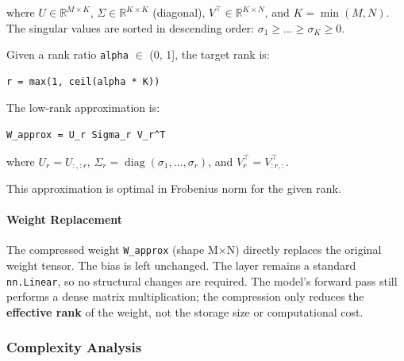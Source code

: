 where $U \in \mathbb{R}^{M \times K}$, $\Sigma \in \mathbb{R}^{K \times K}$ (diagonal), $V^\top \in \mathbb{R}^{K \times N}$, and $K = \min(M,N)$. The singular values are sorted in descending order: $\sigma_1 \ge \dots \ge \sigma_K \ge 0$.

Given a rank ratio \texttt{alpha} $\in$ (0, 1], the target rank is:

\vspace{0.5em}
\begin{mdframed}[backgroundcolor=codebg, linecolor=codeframe, linewidth=1pt, roundcorner=4pt, innerleftmargin=2pt, innerrightmargin=5pt, innertopmargin=5pt, innerbottommargin=5pt]
\begin{lstlisting}
r = max(1, ceil(alpha * K))
\end{lstlisting}
\end{mdframed}
\vspace{0.5em}

The low-rank approximation is:

\vspace{0.5em}
\begin{mdframed}[backgroundcolor=codebg, linecolor=codeframe, linewidth=1pt, roundcorner=4pt, innerleftmargin=2pt, innerrightmargin=5pt, innertopmargin=5pt, innerbottommargin=5pt]
\begin{lstlisting}
W_approx = U_r Sigma_r V_r^T
\end{lstlisting}
\end{mdframed}
\vspace{0.5em}

where $U_r = U_{:, :r}$, $\Sigma_r = \operatorname{diag}(\sigma_1, \dots, \sigma_r)$, and $V_r^\top = V^\top_{:r, :}$.

This approximation is optimal in Frobenius norm for the given rank.

\paragraph{Weight Replacement}

The compressed weight \texttt{W\_approx} (shape M$\times$N) directly replaces the original weight tensor. The bias is left unchanged. The layer remains a standard \texttt{nn.Linear}, so no structural changes are required. The model's forward pass still performs a dense matrix multiplication; the compression only reduces the \textbf{effective rank} of the weight, not the storage size or computational cost.


\subsubsection*{Complexity Analysis}

